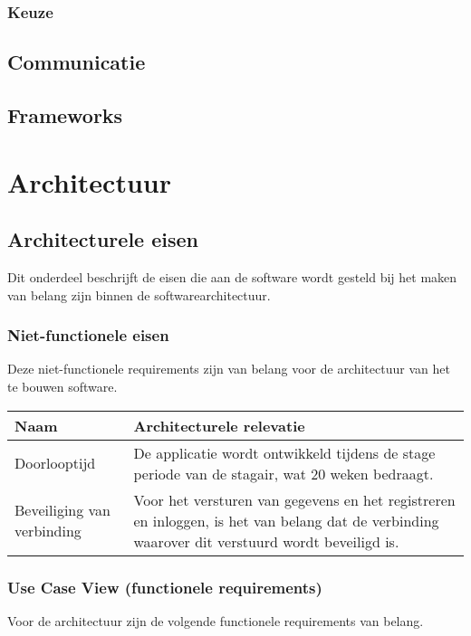 \documentclass[a4paper,11pt,oneside]{report}
\begin{document}
\subsection{Keuze}

\section{Communicatie}

\section{Frameworks}

\chapter{Architectuur}

\section{Architecturele eisen}
\label{architecturele_eisen}
Dit onderdeel beschrijft de eisen die aan de software wordt gesteld bij het
maken van belang zijn binnen de softwarearchitectuur.
\subsection{Niet-functionele eisen}
Deze niet-functionele requirements zijn van belang voor de architectuur van het te bouwen
software.

\begin{table}[h]
\begin{tabular}{| l | p{10cm} |}
\hline
\rowcolor{lightgray}
Naam                       & Architecturele relevatie \\
\hline
Doorlooptijd               & De applicatie wordt ontwikkeld tijdens de stage
                             periode van de stagair, wat 20 weken bedraagt. \\
                             \hline
Beveiliging van verbinding & Voor het versturen van gegevens en het registreren
                             en inloggen, is het van belang dat de verbinding
                             waarover dit verstuurd wordt beveiligd is. \\
                             \hline
\end{tabular}
\end{table}

\subsection{Use Case View (functionele requirements)}
Voor de architectuur zijn de volgende functionele requirements van belang.
\end{document}
